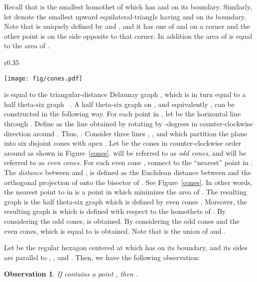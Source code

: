 \documentclass[11pt,a4paper]{article}
\newtheorem{observation}{Observation}
\begin{document}
Recall that  is the smallest homothet of  which has  and  on its boundary. Similarly, let  denote the smallest upward equilateral-triangle  having  and  on its boundary. Note that  is uniquely defined by  and , and it has one of  and  on a corner and the other point is on the side opposite to that corner. In addition the area of  is equal to the area of . 

\begin{wrapfigure}{r}{0.35\textwidth}
\vspace{-20pt}
 \begin{center}
\texttt{[image: fig/cones.pdf]}
  \end{center}
\vspace{-5pt}
  \caption{The construction of .}
\label{cones}
\vspace{-5pt}
\end{wrapfigure}

 is equal to the triangular-distance Delaunay graph , which is in turn equal to a half theta-six graph ~\cite{Bonichon2010}. 
A half theta-six graph on , and equivalently , can be constructed in the following way. For each point  in , let  be the horizontal line through . Define  as the line obtained by rotating  by -degrees in counter-clockwise direction around . Thus, . Consider three lines , , and  which partition the plane into six disjoint cones with apex . Let  be the cones in counter-clockwise order around  as shown in Figure~\ref{cones}.  will be referred to as {\em odd cones}, and  will be referred to as {\em even cones}. For each even cone , connect  to the ``nearest'' point  in . The {\em distance} between  and , is defined as the Euclidean distance between  and the orthogonal projection of  onto the bisector of . See Figure~\ref{cones}. In other words, the nearest point to  in  is a point  in  which minimizes the area of . The resulting graph is the half theta-six graph which is defined by even cones \cite{Bonichon2010}. Moreover, the resulting graph is  which is defined with respect to the homothets of . By considering the odd cones,  is obtained. By considering the odd cones and the even cones, \textemdash which is equal to \textemdash is obtained. Note that  is the union of  and . 

Let  be the regular hexagon centered at  which has  on its boundary, and its sides are parallel to , , and . Then, we have the following observation:
\begin{observation}
\label{obs2}
If  contains a point , then .
\end{observation}
\end{document}
